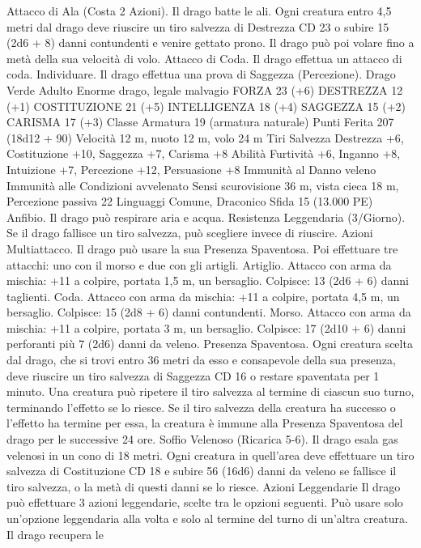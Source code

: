 \begin{multicols}{2}
Attacco di Ala (Costa 2 Azioni). Il drago batte le ali. Ogni
creatura entro 4,5 metri dal drago deve riuscire un tiro salvezza
di Destrezza CD 23 o subire 15 (2d6 + 8) danni contundenti e
venire gettato prono. Il drago può poi volare fino a metà della
sua velocità di volo.
Attacco di Coda. Il drago effettua un attacco di coda.
Individuare. Il drago effettua una prova di Saggezza
(Percezione).
Drago Verde Adulto
Enorme drago, legale malvagio
FORZA 23 (+6)
DESTREZZA 12 (+1)
COSTITUZIONE 21 (+5)
INTELLIGENZA 18 (+4)
SAGGEZZA 15 (+2)
CARISMA 17 (+3)
Classe Armatura 19 (armatura naturale)
Punti Ferita 207 (18d12 + 90)
Velocità 12 m, nuoto 12 m, volo 24 m
Tiri Salvezza Destrezza +6, Costituzione +10, Saggezza +7,
Carisma +8
Abilità Furtività +6, Inganno +8, Intuizione +7, Percezione +12,
Persuasione +8
Immunità al Danno veleno
Immunità alle Condizioni avvelenato
Sensi scurovisione 36 m, vista cieca 18 m, Percezione passiva 22
Linguaggi Comune, Draconico
Sfida 15 (13.000 PE)
Anfibio. Il drago può respirare aria e acqua.
Resistenza Leggendaria (3/Giorno). Se il drago fallisce un tiro
salvezza, può scegliere invece di riuscire.
Azioni
Multiattacco. Il drago può usare la sua Presenza Spaventosa. Poi
effettuare tre attacchi: uno con il morso e due con gli artigli.
Artiglio. Attacco con arma da mischia: +11 a colpire, portata 1,5
m, un bersaglio.
Colpisce: 13 (2d6 + 6) danni taglienti.
Coda. Attacco con arma da mischia: +11 a colpire, portata 4,5
m, un bersaglio.
Colpisce: 15 (2d8 + 6) danni contundenti.
Morso. Attacco con arma da mischia: +11 a colpire, portata 3 m,
un bersaglio.
Colpisce: 17 (2d10 + 6) danni perforanti più 7 (2d6) danni da veleno.
Presenza Spaventosa. Ogni creatura scelta dal drago, che si trovi
entro 36 metri da esso e consapevole della sua presenza, deve
riuscire un tiro salvezza di Saggezza CD 16 o restare spaventata per
1 minuto. Una creatura può ripetere il tiro salvezza al termine di
ciascun suo turno, terminando l’effetto se lo riesce. Se il tiro salvezza
della creatura ha successo o l’effetto ha termine per essa, la creatura è
immune alla Presenza Spaventosa del drago per le successive 24 ore.
Soffio Velenoso (Ricarica 5-6). Il drago esala gas velenosi in un
cono di 18 metri. Ogni creatura in quell’area deve effettuare un tiro
salvezza di Costituzione CD 18 e subire 56 (16d6) danni da veleno se
fallisce il tiro salvezza, o la metà di questi danni se lo riesce.
Azioni Leggendarie
Il drago può effettuare 3 azioni leggendarie, scelte tra le opzioni
seguenti. Può usare solo un’opzione leggendaria alla volta e solo
al termine del turno di un’altra creatura. Il drago recupera le

\end{multicols}
